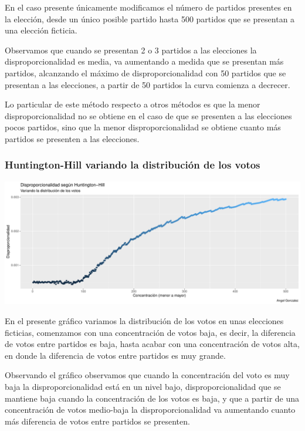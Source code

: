 \documentclass[12pt,a4paper,]{book}
\numberwithin{dummy}{section}
\theoremstyle{ocrenumbox}
\theoremstyle{blacknumex}
\theoremstyle{blacknumbox}
\theoremstyle{ocrenum}
\theoremstyle{ocrenum}
\begin{document}
En el caso presente únicamente modificamos el número de partidos
presentes en la elección, desde un único posible partido hasta 500
partidos que se presentan a una elección ficticia.

Observamos que cuando se presentan 2 o 3 partidos a las elecciones la
disproporcionalidad es media, va aumentando a medida que se presentan
más partidos, alcanzando el máximo de disproporcionalidad con 50
partidos que se presentan a las elecciones, a partir de 50 partidos la
curva comienza a decrecer.

Lo particular de este método respecto a otros métodos es que la menor
disproporcionalidad no se obtiene en el caso de que se presenten a las
elecciones pocos partidos, sino que la menor disproporcionalidad se
obtiene cuanto más partidos se presenten a las elecciones.

\hypertarget{huntington-hill-variando-la-distribuciuxf3n-de-los-votos}{%
\subsubsection{Huntington-Hill variando la distribución de los
votos}\label{huntington-hill-variando-la-distribuciuxf3n-de-los-votos}}

\begin{center}\includegraphics[width=0.95\linewidth]{figurasR/unnamed-chunk-31-1} \end{center}

En el presente gráfico variamos la distribución de los votos en unas
elecciones ficticias, comenzamos con una concentración de votos baja, es
decir, la diferencia de votos entre partidos es baja, hasta acabar con
una concentración de votos alta, en donde la diferencia de votos entre
partidos es muy grande.

Observando el gráfico observamos que cuando la concentración del voto es
muy baja la disproporcionalidad está en un nivel bajo,
disproporcionalidad que se mantiene baja cuando la concentración de los
votos es baja, y que a partir de una concentración de votos medio-baja
la disproporcionalidad va aumentando cuanto más diferencia de votos
entre partidos se presenten.
\end{document}
